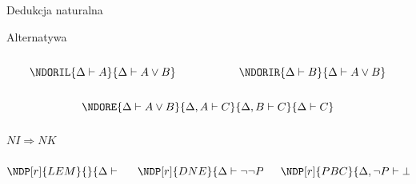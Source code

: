 \documentclass{beamer}
\begin{document}
\begin{frame}{Dedukcja naturalna}
  \begin{block}{Alternatywa}
    \begin{columns}
      \begin{column}{0.5\textwidth}
        $$
        \NDORIL
          {\Delta \vdash A}
          {\Delta \vdash A \lor B}
        $$
      \end{column}

      \begin{column}{0.5\textwidth}
        $$
        \NDORIR
          {\Delta \vdash B}
          {\Delta \vdash A \lor B}
        $$
      \end{column}
    \end{columns}

    \begin{columns}
      \begin{column}{1\textwidth}
        $$
        \NDORE {\Delta \vdash A \lor B} {\Delta, A \vdash C} {\Delta, B \vdash C}
          {\Delta \vdash C}
        $$
      \end{column}

    \end{columns}
  \end{block}

  \pause

  \begin{alertblock}{$NI \Rightarrow NK$}
    \begin{columns}
      \begin{column}{0.3\textwidth}
        $$
        \NDP[r]{LEM}
          {}
          {\Delta \vdash P \lor \neg P}
        $$
      \end{column}

      \begin{column}{0.3\textwidth}
        $$
        \NDP[r]{DNE}
          {\Delta \vdash \neg \neg P}
          {\Delta \vdash P}
        $$
      \end{column}

      \begin{column}{0.3\textwidth}
        $$
        \NDP[r]{PBC}
          {\Delta, \neg P \vdash \bot }
          {\Delta \vdash P}
        $$
      \end{column}
    \end{columns}
  \end{alertblock}
\end{frame}
\end{document}

